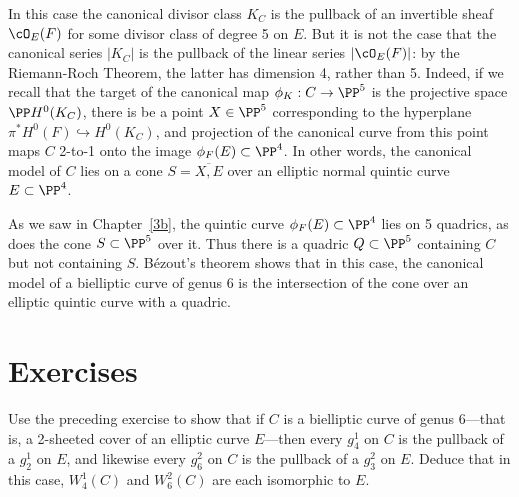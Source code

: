 In this case the canonical divisor class $K_C$ is the pullback of an invertible sheaf $\cO_E(F)$ for some divisor class of degree 5 on $E$. But it is not the case that the canonical series $|K_C|$ is the pullback of the linear series $|\cO_E(F)|$: by the Riemann-Roch Theorem, the latter has dimension 4, rather than 5. Indeed, if we recall that the target of the canonical map $\phi_K : C \to \PP^5$ is the projective space $\PP H^0(K_C)$, there is be a point $X \in \PP^5$ corresponding to the hyperplane $\pi^*H^0(F) \hookrightarrow H^0(K_C)$, and projection of the canonical curve from this point maps $C$ 2-to-1 onto the image $\phi_F(E) \subset \PP^4$. In other words, the canonical model of $C$ lies on a cone $S = \overline{X, E}$ over an elliptic normal quintic curve $E \subset \PP^4$. 

As we saw in Chapter~\ref{3b}, the quintic curve $\phi_F(E) \subset \PP^4$ lies on 5 quadrics, as does the cone $S \subset \PP^5$ over it. Thus there is a quadric $Q \subset \PP^5$ containing $C$ but not containing $S$. B\'ezout's theorem shows that in this case, the canonical model of a bielliptic curve of genus 6 is the intersection of the cone over an elliptic quintic curve with a quadric.

\section{Exercises}

\begin{exercise}
Use the preceding exercise to show that if $C$ is a bielliptic curve of genus 6---that is, a 2-sheeted cover of an elliptic curve $E$---then every $g^1_4$ on $C$ is the pullback of a $g^1_2$ on $E$, and likewise  every $g^2_6$ on $C$ is the pullback of a $g^2_3$ on $E$. Deduce that in this case, $W^1_4(C)$ and $W^2_6(C)$ are each isomorphic to $E$.
\end{exercise}



